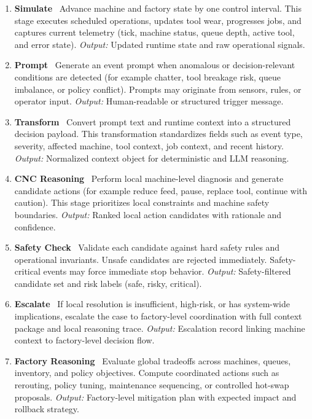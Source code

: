 \documentclass{article}
\begin{document}
\begin{enumerate}
\item \textbf{Simulate} \
Advance machine and factory state by one control interval. This stage executes scheduled operations, updates tool wear, progresses jobs, and captures current telemetry (tick, machine status, queue depth, active tool, and error state).
\textit{Output:} Updated runtime state and raw operational signals.

\item \textbf{Prompt} \
Generate an event prompt when anomalous or decision-relevant conditions are detected (for example chatter, tool breakage risk, queue imbalance, or policy conflict). Prompts may originate from sensors, rules, or operator input.
\textit{Output:} Human-readable or structured trigger message.

\item \textbf{Transform} \
Convert prompt text and runtime context into a structured decision payload. This transformation standardizes fields such as event type, severity, affected machine, tool context, job context, and recent history.
\textit{Output:} Normalized context object for deterministic and LLM reasoning.

\item \textbf{CNC Reasoning} \
Perform local machine-level diagnosis and generate candidate actions (for example reduce feed, pause, replace tool, continue with caution). This stage prioritizes local constraints and machine safety boundaries.
\textit{Output:} Ranked local action candidates with rationale and confidence.

\item \textbf{Safety Check} \
Validate each candidate against hard safety rules and operational invariants. Unsafe candidates are rejected immediately. Safety-critical events may force immediate stop behavior.
\textit{Output:} Safety-filtered candidate set and risk labels (safe, risky, critical).

\item \textbf{Escalate} \
If local resolution is insufficient, high-risk, or has system-wide implications, escalate the case to factory-level coordination with full context package and local reasoning trace.
\textit{Output:} Escalation record linking machine context to factory-level decision flow.

\item \textbf{Factory Reasoning} \
Evaluate global tradeoffs across machines, queues, inventory, and policy objectives. Compute coordinated actions such as rerouting, policy tuning, maintenance sequencing, or controlled hot-swap proposals.
\textit{Output:} Factory-level mitigation plan with expected impact and rollback strategy.


\end{enumerate}
\end{document}
